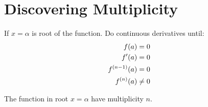 \section{Discovering Multiplicity}

	If $x = \alpha$ is root of the function. Do continuous derivatives until:
	\begin{align}
		f(a) &=  0& \notag \\
		f'(a) &= 0& \notag \\
		f^{(n-1)}(a) &= 0& \notag \\
		f^{(n)}(a) &\neq 0& \\
		\label{eq:multiplicity}
	\end{align}

	The function in root $x = \alpha$ have multiplicity $n$.